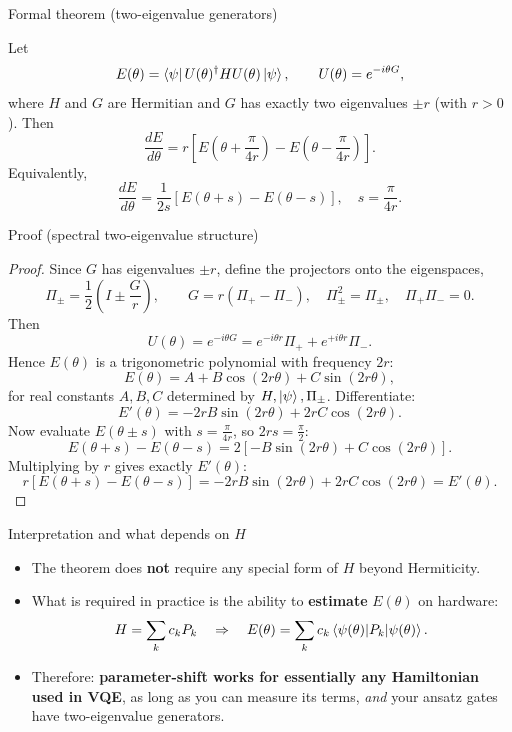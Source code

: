 \documentclass[aspectratio=169]{beamer}
\begin{document}
\begin{frame}{Formal theorem (two-eigenvalue generators)}
\begin{theorem}
Let
\[
E(\theta)=\bra{\psi}U(\theta)^\dagger H U(\theta)\ket{\psi},\qquad
U(\theta)=e^{-i\theta G},
\]
where $H$ and $G$ are Hermitian and $G$ has exactly two eigenvalues $\pm r$ (with $r>0$).
Then
\[
\boxed{
\frac{dE}{d\theta}
=
r\left[E\!\left(\theta+\frac{\pi}{4r}\right)-E\!\left(\theta-\frac{\pi}{4r}\right)\right].
}
\]
Equivalently,
\[
\frac{dE}{d\theta}
=
\frac{1}{2s}\left[E(\theta+s)-E(\theta-s)\right],
\quad s=\frac{\pi}{4r}.
\]
\end{theorem}
\end{frame}

\begin{frame}{Proof (spectral two-eigenvalue structure)}
\begin{proof}
Since $G$ has eigenvalues $\pm r$, define the projectors onto the eigenspaces,
\[
\Pi_\pm=\frac{1}{2}\left(I\pm \frac{G}{r}\right),
\qquad
G=r(\Pi_+-\Pi_-),\quad \Pi_\pm^2=\Pi_\pm,\quad \Pi_+\Pi_-=0.
\]
Then
\[
U(\theta)=e^{-i\theta G}
= e^{-i\theta r}\Pi_+ + e^{+i\theta r}\Pi_-.
\]
Hence $E(\theta)$ is a trigonometric polynomial with frequency $2r$:
\[
E(\theta)=A + B\cos(2r\theta) + C\sin(2r\theta),
\]
for real constants $A,B,C$ determined by $H,\ket{\psi},\Pi_\pm$.
Differentiate:
\[
E'(\theta)= -2rB\sin(2r\theta) + 2rC\cos(2r\theta).
\]
Now evaluate $E(\theta\pm s)$ with $s=\frac{\pi}{4r}$, so $2rs=\frac{\pi}{2}$:
\[
E(\theta+s)-E(\theta-s)
=
2\left[-B\sin(2r\theta)+C\cos(2r\theta)\right].
\]
Multiplying by $r$ gives exactly $E'(\theta)$:
\[
r\left[E(\theta+s)-E(\theta-s)\right]
=
-2rB\sin(2r\theta)+2rC\cos(2r\theta)=E'(\theta).
\]
\end{proof}
\end{frame}

\begin{frame}{Interpretation and what depends on $H$}
\begin{itemize}
\item The theorem does \textbf{not} require any special form of $H$ beyond Hermiticity.
\item What is required in practice is the ability to \textbf{estimate} $E(\theta)$ on hardware:
\[
H=\sum_k c_k P_k \quad\Rightarrow\quad
E(\theta)=\sum_k c_k \expval{P_k}{\psi(\theta)}.
\]
\item Therefore: \textbf{parameter-shift works for essentially any Hamiltonian used in VQE}, as long as you can measure its terms, \emph{and} your ansatz gates have two-eigenvalue generators.
\end{itemize}
\end{frame}
\end{document}
